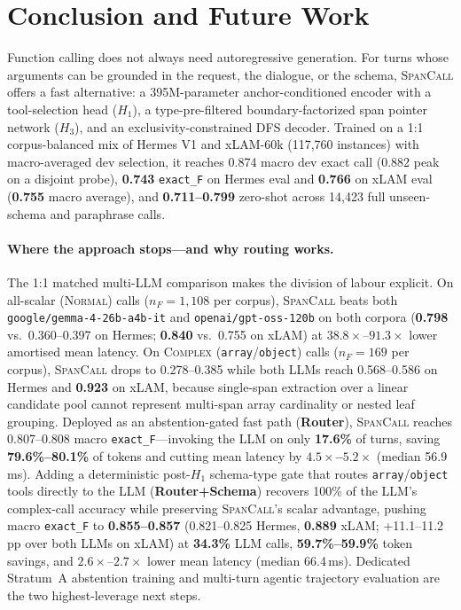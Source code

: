 \section{Conclusion and Future Work}

Function calling does not always need autoregressive generation. For turns whose arguments can be grounded in the request, the dialogue, or the schema, \textsc{SpanCall} offers a fast alternative: a 395M-parameter anchor-conditioned encoder with a tool-selection head ($H_1$), a type-pre-filtered boundary-factorized span pointer network ($H_3$), and an exclusivity-constrained DFS decoder. Trained on a 1:1 corpus-balanced mix of Hermes V1 and xLAM-60k (117,760 instances) with macro-averaged dev selection, it reaches 0.874 macro dev exact call (0.882 peak on a disjoint probe), \textbf{0.743} \texttt{exact\_F} on Hermes eval and \textbf{0.766} on xLAM eval (\textbf{0.755} macro average), and \textbf{0.711--0.799} zero-shot across 14,423 full unseen-schema and paraphrase calls.

\paragraph{Where the approach stops---and why routing works.}
The 1:1 matched multi-LLM comparison makes the division of labour explicit. On all-scalar (\textsc{Normal}) calls ($n_F{=}1{,}108$ per corpus), \textsc{SpanCall} beats both \texttt{google/gemma-4-26b-a4b-it} and \texttt{openai/gpt-oss-120b} on both corpora (\textbf{0.798} vs.\ 0.360--0.397 on Hermes; \textbf{0.840} vs.\ 0.755 on xLAM) at $38.8\times$--$91.3\times$ lower amortised mean latency. On \textsc{Complex} (\texttt{array}/\texttt{object}) calls ($n_F{=}169$ per corpus), \textsc{SpanCall} drops to 0.278--0.385 while both LLMs reach 0.568--0.586 on Hermes and \textbf{0.923} on xLAM, because single-span extraction over a linear candidate pool cannot represent multi-span array cardinality or nested leaf grouping. Deployed as an abstention-gated fast path (\textbf{Router}), \textsc{SpanCall} reaches 0.807--0.808 macro \texttt{exact\_F}---invoking the LLM on only \textbf{17.6\%} of turns, saving \textbf{79.6\%--80.1\%} of tokens and cutting mean latency by \textbf{$4.5\times$--$5.2\times$} (median 56.9\,ms). Adding a deterministic post-$H_1$ schema-type gate that routes \texttt{array}/\texttt{object} tools directly to the LLM (\textbf{Router+Schema}) recovers 100\% of the LLM's complex-call accuracy while preserving \textsc{SpanCall}'s scalar advantage, pushing macro \texttt{exact\_F} to \textbf{0.855--0.857} (0.821--0.825 Hermes, \textbf{0.889} xLAM; +11.1--11.2\,pp over both LLMs on xLAM) at \textbf{34.3\%} LLM calls, \textbf{59.7\%--59.9\%} token savings, and $2.6\times$--$2.7\times$ lower mean latency (median 66.4\,ms). Dedicated Stratum~A abstention training and multi-turn agentic trajectory evaluation are the two highest-leverage next steps.

